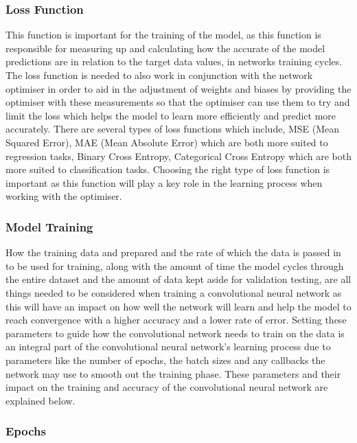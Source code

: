 \documentclass[]{final_report}
\begin{document}
\subsubsection{Loss Function}

This function is important for the training of the model, as this function is responsible for measuring up and calculating how the accurate of the model predictions are in relation to the target data values, in networks training cycles. The loss function is needed to also work in conjunction with the network optimiser in order to aid in the adjustment of weights and biases by providing the optimiser with these measurements so that the optimiser can use them to try and limit the loss which helps the model to learn more efficiently and predict more accurately. There are several types of loss functions which include, MSE (Mean Squared Error), MAE (Mean Absolute Error) which are both more suited to regression tasks, Binary Cross Entropy, Categorical Cross Entropy which are both more suited to classification tasks. Choosing the right type of loss function is important as this function will play a key role in the learning process when working with the optimiser.

\subsubsection{Model Training}

How the training data and prepared and the rate of which the data is passed in to be used for training, along with the amount of time the model cycles through the entire dataset and the amount of data kept aside for validation testing, are all things needed to be considered when training a convolutional neural network as this will have an impact on how well the network will learn and help the model to reach convergence with a higher accuracy and a lower rate of error. Setting these parameters to guide how the convolutional network needs to train on the data is an integral part of the convolutional neural network’s learning process due to parameters like the number of epochs, the batch sizes and any callbacks the network may use to smooth out the training phase. These parameters and their impact on the training and accuracy of the convolutional neural network are explained below.

\subsubsection{Epochs}
\end{document}
